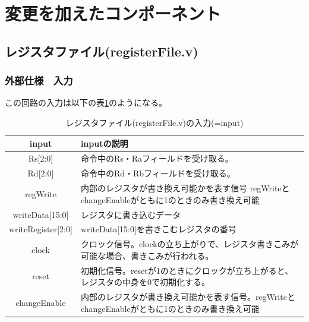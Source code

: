 \documentclass[a4j,titlepage]{jarticle}
\begin{document}
\newpage
\section{変更を加えたコンポーネント}
\subsection{レジスタファイル(registerFile.v)}

\subsubsection{外部仕様　入力}
この回路の入力は以下の表\ref{registerFileI}のようになる。
\begin{table}[H]
    \caption{レジスタファイル(registerFile.v)の入力(=input)}
    \label{registerFileI}
    \begin{center}
    \begin {tabularx}{150mm}{|c|X|} \hline
         input & inputの説明 \\ \hline \hline
         Rs[2:0] & 命令中のRs・Raフィールドを受け取る。\\ \hline
         Rd[2:0] & 命令中のRd・Rbフィールドを受け取る。\\ \hline
         regWrite & 内部のレジスタが書き換え可能かを表す信号 regWriteとchangeEnableがともに1のときのみ書き換え可能\\ \hline
         writeData[15:0] & レジスタに書き込むデータ\\ \hline
         writeRegister[2:0] & writeData[15:0]を書きこむレジスタの番号\\ \hline
         clock & クロック信号。clockの立ち上がりで、レジスタ書きこみが可能な場合、書きこみが行われる。\\ \hline
         reset & 初期化信号。resetが1のときにクロックが立ち上がると、レジスタの中身を0で初期化する。\\ \hline
         changeEnable & 内部のレジスタが書き換え可能かを表す信号。regWriteとchangeEnableがともに1のときのみ書き換え可能\\ \hline
    \end{tabularx}
    \end{center}
\end{table}
\end{document}

